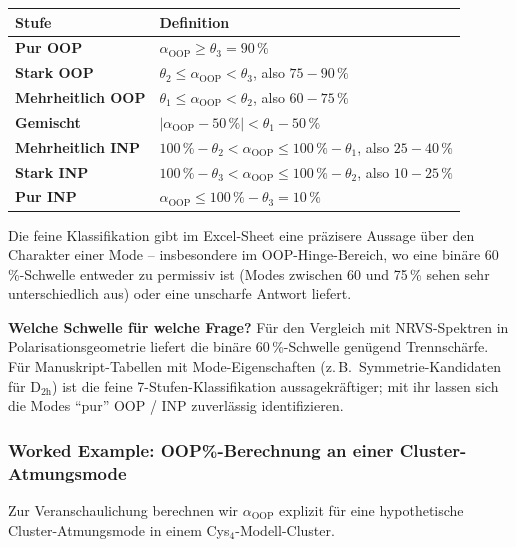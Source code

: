 \documentclass[11pt,a4paper,twoside]{article}
\newcommand{\OOP}{\mathrm{OOP}}
\theoremstyle{remark}
\begin{document}
\begin{center}
\begin{tabularx}{\textwidth}{l X}
\toprule
\textbf{Stufe} & \textbf{Definition} \\
\midrule
\textbf{Pur OOP}        & $\alpha_{\OOP} \geq \theta_3 = 90\,\%$ \\
\textbf{Stark OOP}      & $\theta_2 \leq \alpha_{\OOP} < \theta_3$, also $75-90\,\%$ \\
\textbf{Mehrheitlich OOP} & $\theta_1 \leq \alpha_{\OOP} < \theta_2$, also $60-75\,\%$ \\
\textbf{Gemischt}       & $|{\alpha_{\OOP} - 50\,\%}| < \theta_1 - 50\,\%$ \\
\textbf{Mehrheitlich INP} & $100\,\% - \theta_2 < \alpha_{\OOP} \leq 100\,\% - \theta_1$, also $25-40\,\%$ \\
\textbf{Stark INP}      & $100\,\% - \theta_3 < \alpha_{\OOP} \leq 100\,\% - \theta_2$, also $10-25\,\%$ \\
\textbf{Pur INP}        & $\alpha_{\OOP} \leq 100\,\% - \theta_3 = 10\,\%$ \\
\bottomrule
\end{tabularx}
\end{center}

Die feine Klassifikation gibt im Excel-Sheet eine pr\"azisere Aussage
\"uber den Charakter einer Mode -- insbesondere im OOP-Hinge-Bereich,
wo eine bin\"are 60\,\%-Schwelle entweder zu permissiv ist (Modes
zwischen 60 und 75\,\% sehen sehr unterschiedlich aus) oder eine
unscharfe Antwort liefert.

\begin{infobox}
\textbf{Welche Schwelle f\"ur welche Frage?} F\"ur den Vergleich mit
NRVS-Spektren in Polarisationsgeometrie liefert die bin\"are 60\,\%-Schwelle
gen\"ugend Trennsch\"arfe. F\"ur Manuskript-Tabellen mit
Mode-Eigenschaften (z.\,B.\ Symmetrie-Kandidaten f\"ur D$_\mathrm{2h}$)
ist die feine 7-Stufen-Klassifikation aussagekr\"aftiger; mit ihr
lassen sich die Modes "`pur"' OOP / INP zuverl\"assig identifizieren.
\end{infobox}

\subsubsection*{Worked Example: OOP\%-Berechnung an einer Cluster-Atmungsmode}

Zur Veranschaulichung berechnen wir $\alpha_{\OOP}$ explizit f\"ur eine
hypothetische Cluster-Atmungsmode in einem Cys$_4$-Modell-Cluster.
\end{document}
